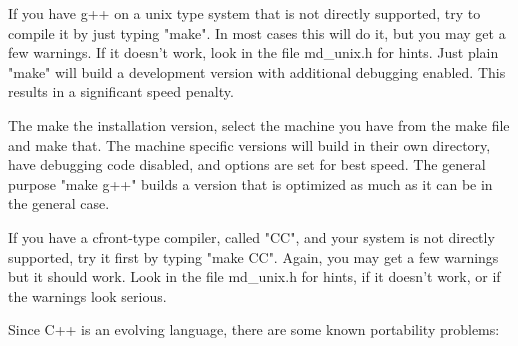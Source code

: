 If you have g++ on a unix type system that is not directly supported,
try to compile it by just typing "make".  In most cases this will
do it, but you may get a few warnings.  If it doesn't work, look
in the file md\_unix.h for hints.  Just plain "make" will build a
development version with additional debugging enabled.  This results
in a significant speed penalty.

The make the installation version, select the machine you have from
the make file and make that.  The machine specific versions will
build in their own directory, have debugging code disabled, and
options are set for best speed.  The general purpose "make g++"
builds a version that is optimized as much as it can be in the
general case.

If you have a cfront-type compiler, called "CC", and your system
is not directly supported, try it first by typing "make CC".  Again,
you may get a few warnings but it should work.  Look in the file
md\_unix.h for hints, if it doesn't work, or if the warnings look
serious.

Since C++ is an evolving language, there are some known portability
problems:

